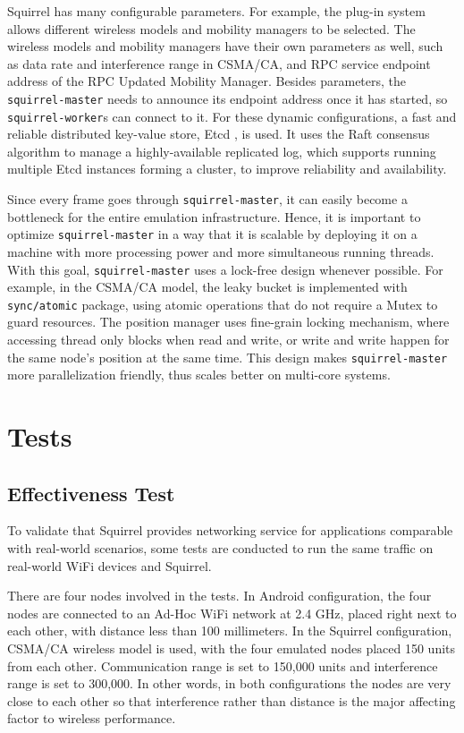 \documentclass[12pt]{report}
\begin{document}
Squirrel has many configurable parameters. For example, the plug-in system allows different wireless models and mobility managers to be selected. The wireless models and mobility managers have their own parameters as well, such as data rate and interference range in CSMA/CA, and RPC service endpoint address of the RPC Updated Mobility Manager. Besides parameters, the \texttt{squirrel-master} needs to announce its endpoint address once it has started, so \texttt{squirrel-worker}s can connect to it. For these dynamic configurations, a fast and reliable distributed key-value store, Etcd \cite{etcd}, is used. It uses the Raft consensus algorithm \cite{ongaro2014search} to manage a highly-available replicated log, which supports running multiple Etcd instances forming a cluster, to improve reliability and availability.

Since every frame goes through \texttt{squirrel-master}, it can easily become a bottleneck for the entire emulation infrastructure. Hence, it is important to optimize \texttt{squirrel-master} in a way that it is scalable by deploying it on a machine with more processing power and more simultaneous running threads. With this goal, \texttt{squirrel-master} uses a lock-free design whenever possible. For example, in the CSMA/CA model, the leaky bucket is implemented with \texttt{sync/atomic} package, using atomic operations that do not require a Mutex to guard resources. The position manager uses fine-grain locking mechanism, where accessing thread only blocks when read and write, or write and write happen for the same node's position at the same time. This design makes \texttt{squirrel-master} more parallelization friendly, thus scales better on multi-core systems.

\section{Tests}

\subsection{Effectiveness Test}

To validate that Squirrel provides networking service for applications comparable with real-world scenarios, some tests are conducted to run the same traffic on real-world WiFi devices and Squirrel.

There are four nodes involved in the tests. In Android configuration, the four nodes are connected to an Ad-Hoc WiFi network at 2.4 GHz, placed right next to each other, with distance less than 100 millimeters. In the Squirrel configuration, CSMA/CA wireless model is used, with the four emulated nodes placed 150 units from each other. Communication range is set to 150,000 units and interference range is set to 300,000. In other words, in both configurations the nodes are very close to each other so that interference rather than distance is the major affecting factor to wireless performance.
\end{document}
